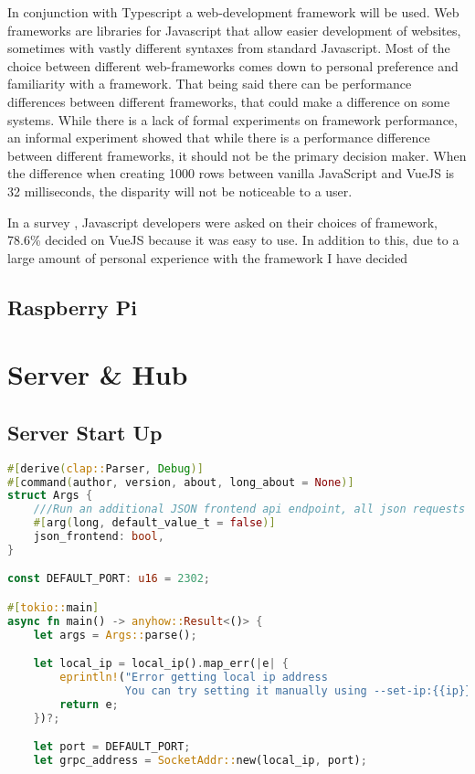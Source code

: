 In conjunction with Typescript a web-development framework will be used. Web frameworks are libraries for Javascript that allow easier development of websites, sometimes with vastly different syntaxes from standard Javascript. Most of the choice between different web-frameworks comes down to personal preference and familiarity with a framework. That being said there can be performance differences between different frameworks, that could make a difference on some systems. While there is a lack of formal experiments on framework performance, an informal experiment \cite{performanceComparisonJS} showed that while there is a performance difference between different frameworks, it should not be the primary decision maker. When the difference when creating 1000 rows between vanilla JavaScript and VueJS is 32 milliseconds, the disparity will not be noticeable to a user.

In a survey \cite{adoptionOfJSFrameworks}, Javascript developers were asked on their choices of framework, 78.6\% decided on VueJS because it was easy to use. In addition to this, due to a large amount of personal experience with the framework I have decided

\subsection{Raspberry Pi} \label{sec:chap3:technology:raspi}


\section{Server \& Hub} \label{sec:chap3:server}
\subsection{Server Start Up} \label{sec:chap3:server:startup}
\begin{lstlisting}[language=Rust, style=boxed, showstringspaces=false]
#[derive(clap::Parser, Debug)]
#[command(author, version, about, long_about = None)]
struct Args {
    ///Run an additional JSON frontend api endpoint, all json requests get routed to main GRPC
    #[arg(long, default_value_t = false)]
    json_frontend: bool,
}

const DEFAULT_PORT: u16 = 2302;

#[tokio::main]
async fn main() -> anyhow::Result<()> {
    let args = Args::parse();

    let local_ip = local_ip().map_err(|e| {
        eprintln!("Error getting local ip address
                  You can try setting it manually using --set-ip:{{ip}}"); 
        return e;
    })?;

    let port = DEFAULT_PORT;
    let grpc_address = SocketAddr::new(local_ip, port);
\end{lstlisting}
